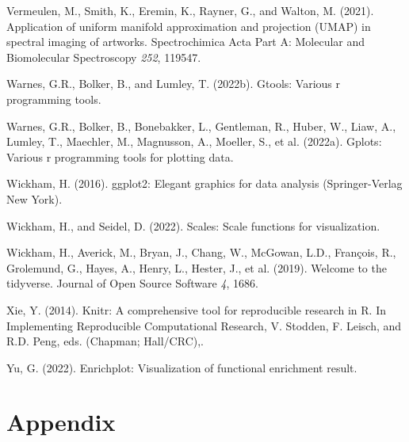 \documentclass[
  parskip,
  oneside]{scrreprt}
\newlength{\cslhangindent}
\newlength{\cslentryspacingunit} %
\newenvironment{CSLReferences}[2] %
 {%
  \setlength{\parindent}{0pt}
  \ifodd #1
  \let\oldpar\par
  \def\par{\hangindent=\cslhangindent\oldpar}
  \fi
  \setlength{\parskip}{#2\cslentryspacingunit}
 }%
 {}
\begin{document}
\begin{CSLReferences}{0}{0}
\leavevmode{}%
Vermeulen, M., Smith, K., Eremin, K., Rayner, G., and Walton, M. (2021).
Application of uniform manifold approximation and projection (UMAP) in
spectral imaging of artworks. Spectrochimica Acta Part A: Molecular and
Biomolecular Spectroscopy \emph{252}, 119547.

\leavevmode{}%
Warnes, G.R., Bolker, B., and Lumley, T. (2022b). Gtools: Various r
programming tools.

\leavevmode{}%
Warnes, G.R., Bolker, B., Bonebakker, L., Gentleman, R., Huber, W.,
Liaw, A., Lumley, T., Maechler, M., Magnusson, A., Moeller, S., et al.
(2022a). Gplots: Various r programming tools for plotting data.

\leavevmode{}%
Wickham, H. (2016). ggplot2: Elegant graphics for data analysis
(Springer-Verlag New York).

\leavevmode{}%
Wickham, H., and Seidel, D. (2022). Scales: Scale functions for
visualization.

\leavevmode{}%
Wickham, H., Averick, M., Bryan, J., Chang, W., McGowan, L.D., François,
R., Grolemund, G., Hayes, A., Henry, L., Hester, J., et al. (2019).
Welcome to the {tidyverse}. Journal of Open Source Software \emph{4},
1686.

\leavevmode{}%
Xie, Y. (2014). Knitr: A comprehensive tool for reproducible research in
{R}. In Implementing Reproducible Computational Research, V. Stodden, F.
Leisch, and R.D. Peng, eds. (Chapman; Hall/CRC),.

\leavevmode{}%
Yu, G. (2022). Enrichplot: Visualization of functional enrichment
result.

\end{CSLReferences}

\hypertarget{appendix}{%
\chapter{Appendix}\label{appendix}}
\end{document}
